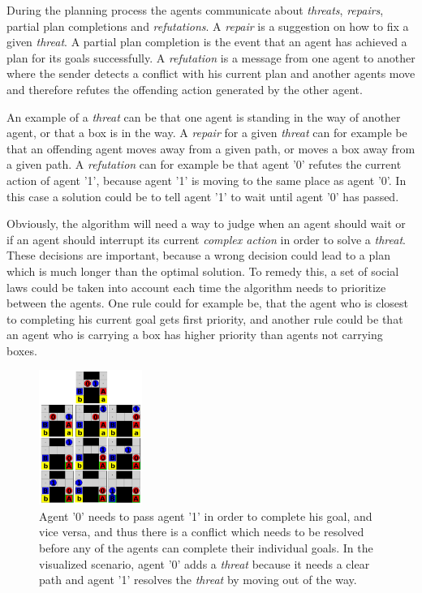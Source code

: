 \documentclass[Main]{subfiles}
\begin{document}
During the planning process the agents communicate about \textit{threats}, \textit{repairs}, partial plan completions and \textit{refutations}.
A \textit{repair} is a suggestion on how to fix a given \textit{threat}.
A partial plan completion is the event that an agent has achieved a plan for its goals successfully.
A \textit{refutation} is a message from one agent to another where the sender detects a conflict with his current plan and another agents move and therefore refutes the offending action generated by the other agent.

An example of a \textit{threat} can be that one agent is standing in the way of another agent, or that a box is in the way.
A \textit{repair} for a given \textit{threat} can for example be that an offending agent moves away from a given path, or moves a box away from a given path.
A \textit{refutation} can for example be that agent '0' refutes the current action of agent '1', because agent '1' is moving to the same place as agent '0'. In this case a solution could be to tell agent '1' to wait until agent '0' has passed.

Obviously, the algorithm will need a way to judge when an agent should wait or if an agent should interrupt its current \textit{complex action} in order to solve a \textit{threat}. These decisions are important, because a wrong decision could lead to a plan which is much longer than the optimal solution.
To remedy this, a set of social laws could be taken into account each time the algorithm needs to prioritize between the agents.
One rule could for example be, that the agent who is closest to completing his current goal gets first priority, and another rule could be that an agent who is carrying a box has higher priority than agents not carrying boxes.

\begin{figure}[h!]
	\centering
	\includegraphics[width=0.3\textwidth]{plan_collab.png}
	\caption{Agent '0' needs to pass agent '1' in order to complete his goal, and vice versa, and thus there is a conflict which needs to be resolved before any of the agents can complete their individual goals. In the visualized scenario, agent '0' adds a \textit{threat} because it needs a clear path and agent '1' resolves the \textit{threat} by moving out of the way.}
	\label{fig:plan_collab}
\end{figure}
\end{document}
